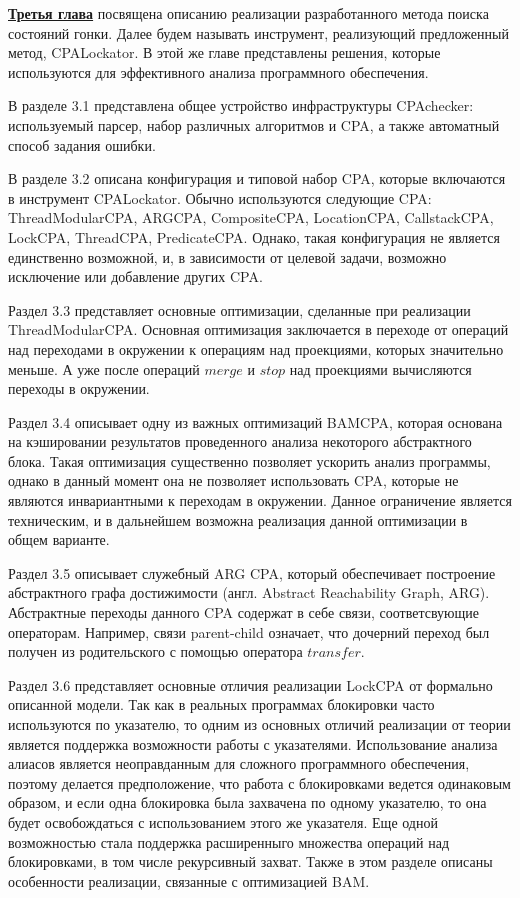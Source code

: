 \underline{\textbf{Третья глава}} посвящена описанию реализации разработанного метода поиска состояний гонки.
Далее будем называть инструмент, реализующий предложенный метод, CPALockator.
В этой же главе представлены решения, которые используются для эффективного анализа программного обеспечения.

В разделе 3.1 представлена общее устройство инфраструктуры CPAchecker: используемый парсер, набор различных алгоритмов и CPA, а также автоматный способ задания ошибки.

В разделе 3.2 описана конфигурация и типовой набор CPA, которые включаются в инструмент CPALockator.
Обычно используются следующие CPA: ThreadModularCPA, ARGCPA, CompositeCPA, LocationCPA, CallstackCPA, LockCPA, ThreadCPA, PredicateCPA.
Однако, такая конфигурация не является единственно возможной, и, в зависимости от целевой задачи, возможно исключение или добавление других CPA.

Раздел 3.3 представляет основные оптимизации, сделанные при реализации ThreadModularCPA. 
Основная оптимизация заключается в переходе от операций над переходами в окружении к операциям над проекциями, которых значительно меньше.
А уже после операций $merge$ и $stop$ над проекциями вычисляются переходы в окружении.

Раздел 3.4 описывает одну из важных оптимизаций BAMCPA, которая основана на кэшировании результатов проведенного анализа некоторого абстрактного блока.
Такая оптимизация существенно позволяет ускорить анализ программы, однако в данный момент она не позволяет использовать CPA, которые не являются инвариантными к переходам в окружении.
Данное ограничение является техническим, и в дальнейшем возможна реализация данной оптимизации в общем варианте.

Раздел 3.5 описывает служебный ARG CPA, который обеспечивает построение абстрактного графа достижимости (англ. Abstract Reachability Graph, ARG).
Абстрактные переходы данного CPA содержат в себе связи, соответсвующие операторам.
Например, связи parent-child означает, что дочерний переход был получен из родительского с помощью оператора $transfer$.

Раздел 3.6 представляет основные отличия реализации LockCPA от формально описанной модели. 
Так как в реальных программах блокировки часто используются по указателю, то одним из основных отличий реализации от теории является поддержка возможности работы с указателями.
Использование анализа алиасов является неоправданным для сложного программного обеспечения, поэтому делается предположение, что работа с блокировками ведется одинаковым образом, и если одна блокировка была захвачена по одному указателю, то она будет освобождаться с использованием этого же указателя.
Еще одной возможностью стала поддержка расширенныго множества операций над блокировками, в том числе рекурсивный захват.
Также в этом разделе описаны особенности реализации, связанные с оптимизацией BAM.


